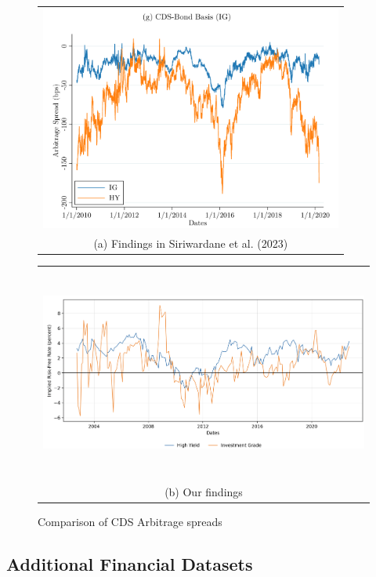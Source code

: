 \documentclass{article}
\begin{document}
\begin{appendices}
\begin{figure}
  \centering
  \begin{tabular}{@{}c@{}}
    \includegraphics[width=.7\linewidth,height=210pt,width=350pt]{../docs_src/SegArb_CDS_Timeseries.png} \\[\abovecaptionskip]
    \small (a) Findings in Siriwardane et al. (2023)
  \end{tabular}

  \vspace{\floatsep}

  \begin{tabular}{@{}c@{}}
    \includegraphics[width=.7\linewidth,height=200pt,width=400pt]{../docs_src/CDS_replicate.png} \\[\abovecaptionskip]
    \small (b) Our findings
  \end{tabular}

  \caption{Comparison of CDS Arbitrage spreads}
  \label{fig:CDS_replicate}
\end{figure}

\FloatBarrier

\subsection{Additional Financial Datasets}
\label{sec:additional_datasets}


\end{appendices}
\end{document}
